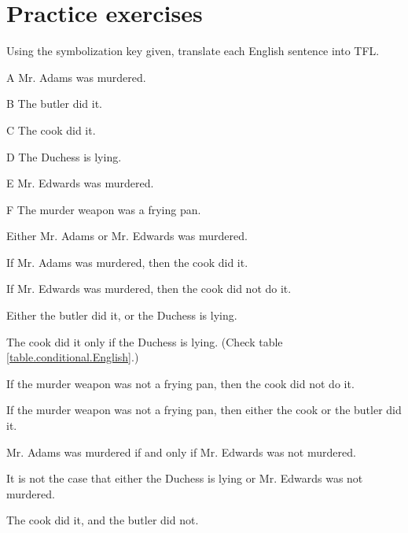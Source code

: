 
\section{Practice exercises}
\setcounter{ProbPart}{0}


\problempart Using the symbolization key given, translate each English sentence into TFL.
\begin{ekey}
\item[A] Mr. Adams was murdered.
\item[B] The butler did it.
\item[C] The cook did it.
\item[D] The Duchess is lying.
\item[E] Mr. Edwards was murdered.
\item[F] The murder weapon was a frying pan.
\end{ekey}

\begin{earg}
\item Either Mr. Adams or Mr. Edwards was murdered.
\item If Mr. Adams was murdered, then the cook did it.
\item If Mr. Edwards was murdered, then the cook did not do it.
\item Either the butler did it, or the Duchess is lying.
\item The cook did it only if the Duchess is lying. (Check table \ref{table.conditional.English}.)
\item If the murder weapon was not a frying pan, then the cook did not do it.
\item If the murder weapon was not a frying pan, then either the cook or the butler did it.
\item Mr. Adams was murdered if and only if Mr. Edwards was not murdered.
\item It is not the case that either the Duchess is lying or Mr. Edwards was not murdered.
\item The cook did it, and the butler did not.
\end{earg}


